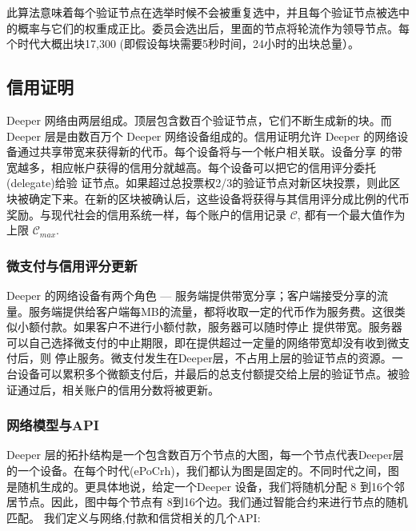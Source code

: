 \documentclass[a4paper]{article}
\begin{document}
此算法意味着每个验证节点在选举时候不会被重复选中，并且每个验证节点被选中的概率与它们的权重成正比。委员会选出后，里面的节点将轮流作为领导节点。每个时代大概出块17,300 (即假设每块需要5秒时间，24小时的出块总量）。

\subsection{信用证明}
Deeper 网络由两层组成。顶层包含数百个验证节点，它们不断生成新的块。而 Deeper 层是由数百万个 Deeper 网络设备组成的。信用证明允许 Deeper 的网络设备通过共享带宽来获得新的代币。每个设备将与一个帐户相关联。设备分享
的带宽越多，相应帐户获得的信用分就越高。每个设备可以把它的信用评分委托(delegate)给验
证节点。如果超过总投票权2/3的验证节点对新区块投票，则此区块被确定下来。在新的区块被确认后，这些设备将获得与其信用评分成比例的代币奖励。与现代社会的信用系统一样，每个账户的信用记录 $\mathcal{C}$, 都有一个最大值作为上限 $\mathcal{C}_{max}$.

\subsubsection{微支付与信用评分更新}
Deeper 的网络设备有两个角色 --- 服务端提供带宽分享；客户端接受分享的流量。服务端提供给客户端每MB的流量，都将收取一定的代币作为服务费。这很类似小额付款。如果客户不进行小额付款，服务器可以随时停止
提供带宽。服务器可以自己选择微支付的中止期限，即在提供超过一定量的网络带宽却没有收到微支付后，则
停止服务。微支付发生在Deeper层，不占用上层的验证节点的资源。一台设备可以累积多个微额支付后，并最后的总支付额提交给上层的验证节点。被验证通过后，相关账户的信用分数将被更新。

\subsubsection{网络模型与API}
Deeper 层的拓扑结构是一个包含数百万个节点的大图，每一个节点代表Deeper层的一个设备。在每个时代(ePoCrh)，我们都认为图是固定的。不同时代之间，图是随机生成的。更具体地说，给定一个Deeper 设备，我们将随机分配 8 到16个邻居节点。因此，图中每个节点有 8到16个边。我们通过智能合约来进行节点的随机匹配。 我们定义与网络,付款和信贷相关的几个API:
\end{document}
